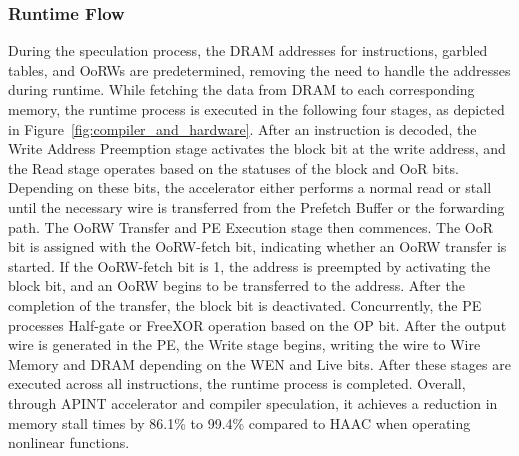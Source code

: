 
\subsubsection{\textbf{Runtime Flow}}

During the speculation process, the DRAM addresses for instructions, garbled tables, and OoRWs are predetermined, removing the need to handle the addresses during runtime. While fetching the data from DRAM to each corresponding memory, the runtime process is executed in the following four stages, as depicted in Figure~\ref{fig:compiler_and_hardware}.
After an instruction is decoded, the Write Address Preemption stage activates the block bit at the write address, and the Read stage operates based on the statuses of the block and OoR bits. Depending on these bits, the accelerator either performs a normal read or stall until the necessary wire is transferred from the Prefetch Buffer or the forwarding path. The OoRW Transfer and PE Execution stage then commences. The OoR bit is assigned with the OoRW-fetch bit, indicating whether an OoRW transfer is started. If the OoRW-fetch bit is 1, the address is preempted by activating the block bit, and an OoRW begins to be transferred to the address. After the completion of the transfer, the block bit is deactivated. Concurrently, the PE processes Half-gate or FreeXOR operation based on the OP bit. After the output wire is generated in the PE, the Write stage begins, writing the wire to Wire Memory and DRAM depending on the WEN and Live bits. After these stages are executed across all instructions, the runtime process is completed. Overall, through APINT accelerator and compiler speculation, it achieves a reduction in memory stall times by 86.1\% to 99.4\% compared to HAAC when operating nonlinear functions.

